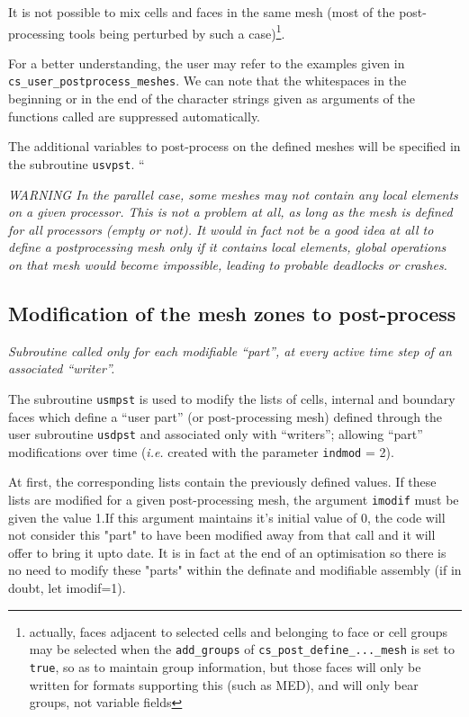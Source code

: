 {{{It is not possible to mix cells and faces in the same mesh (most of
the post-processing tools being perturbed by such a case)\footnote{actually,
faces adjacent to selected cells and belonging to face or cell groups
may be selected when the \texttt{add\_groups} of
\texttt{cs\_post\_define\_...\_mesh} is set to \texttt{true},
so as to maintain group information, but those faces will
only be written for formats supporting this (such as MED),
and will only bear groups, not variable fields}.

For a better understanding, the user may refer to the examples given in
\texttt{cs\_user\_postprocess\_meshes}. We can note that the whitespaces
in the beginning or in the end of the character strings given as arguments
of the functions called are suppressed automatically.

The additional variables to post-process on the defined meshes
will be specified in the subroutine \texttt{usvpst}.  ``

{\em WARNING In the parallel case, some meshes may not contain any
local elements on a given processor. This is not a problem at all, as
long as the mesh is defined for all processors (empty or not).
It would in fact not be a good idea at all to define a postprocessing
mesh only if it contains local elements, global operations on that
mesh would become impossible, leading to probable deadlocks or crashes.}

\subsection{Modification of the mesh zones to post-process}

\noindent
\textit{Subroutine called only for each modifiable ``part'', at every
active time step of an associated ``writer''.}

The subroutine \texttt{usmpst} is used to modify the
lists of cells, internal and boundary faces which define a ``user part'' (or
post-processing mesh) defined through the user subroutine
\texttt{usdpst} and associated only with ``writers''; allowing ``part''
modifications over time ({\em i.e.} created with the
parameter \texttt{indmod} = 2).

At first, the corresponding lists contain the previously defined
values. If these lists are modified for a given post-processing mesh, the
argument \texttt{imodif} must be given the value 1.If this argument
 maintains it's initial value of 0, the code will not consider this
 "part" to have been modified away from that call and it will offer
 to bring it upto date. It is in fact at the end of an optimisation
 so there is no need to modify these "parts" within the definate and
 modifiable assembly (if in doubt, let imodif=1).

}}}
